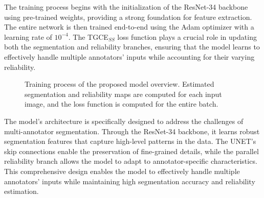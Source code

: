 The training process begins with the initialization of the ResNet-34
backbone using pre-trained weights, providing a strong foundation for
feature extraction. The entire network is then trained end-to-end
using the Adam optimizer with a learning rate of $10^{-4}$. The
TGCE$_{SS}$ loss function plays a crucial role in updating both the
segmentation and reliability branches, ensuring that the model learns
to effectively handle multiple annotators' inputs while accounting
for their varying reliability.
\begin{figure}[h]
  \centering
  \caption{Training process of the proposed model overview. Estimated
    segmentation and reliability maps are computed for each input
  image, and the loss function is computed for the entire batch.}
  \label{fig:optimization_process}
\end{figure}

The model's architecture is specifically designed to address the
challenges of multi-annotator segmentation. Through the ResNet-34
backbone, it learns robust segmentation features that capture
high-level patterns in the data. The UNET's skip connections enable
the preservation of fine-grained details, while the parallel
reliability branch allows the model to adapt to annotator-specific
characteristics. This comprehensive design enables the model to
effectively handle multiple annotators' inputs while maintaining high
segmentation accuracy and reliability estimation.